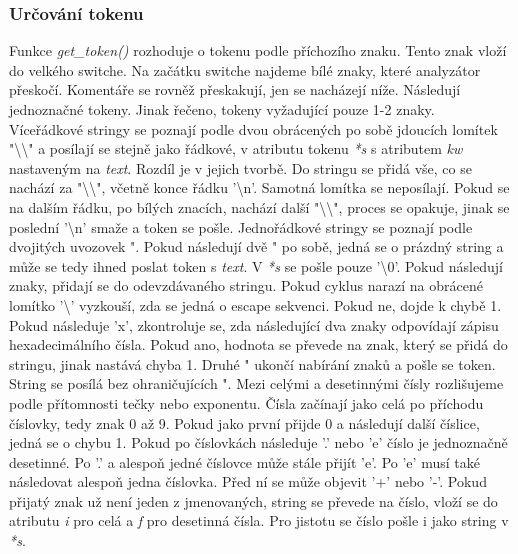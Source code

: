 \documentclass[a4paper, 12pt]{article}
\begin{document}
\subsubsection{Určování tokenu}
Funkce \textit{get\_token()} rozhoduje o tokenu podle příchozího znaku. Tento znak vloží do velkého switche.\newline
Na začátku switche najdeme bílé znaky, které analyzátor přeskočí. Komentáře se rovněž přeskakují, jen se nacházejí níže.\newline
Následují jednoznačné tokeny. Jinak řečeno, tokeny vyžadující pouze 1-2 znaky.\newline
Víceřádkové stringy se poznají podle dvou obrácených po sobě jdoucích lomítek "\textbackslash\textbackslash" a posílají se stejně jako řádkové, v atributu tokenu \textit{*s} s atributem \textit{kw} nastaveným na \textit{text}. Rozdíl je v jejich tvorbě. Do stringu se přidá vše, co se nachází za "\textbackslash\textbackslash", včetně konce řádku '\textbackslash n'. Samotná lomítka se neposílají. Pokud se na dalším řádku, po bílých znacích, nachází další "\textbackslash\textbackslash", proces se opakuje, jinak se poslední '\textbackslash n' smaže a token se pošle.\newline
Jednořádkové stringy se poznají podle dvojitých uvozovek ". Pokud následují dvě " po sobě, jedná se o prázdný string a může se tedy ihned poslat token s \textit{text}. V \textit{*s} se pošle pouze '\textbackslash0'. Pokud následují znaky, přidají se do odevzdávaného stringu. Pokud cyklus narazí na obrácené lomítko '\textbackslash' vyzkouší, zda se jedná o escape sekvenci. Pokud ne, dojde k chybě 1. Pokud následuje 'x', zkontroluje se, zda následující dva znaky odpovídají zápisu hexadecimálního čísla. Pokud ano, hodnota se převede na znak, který se přidá do stringu, jinak nastává chyba 1. Druhé " ukončí nabírání znaků a pošle se token. String se posílá bez ohraničujících ".\newline
Mezi celými a desetinnými čísly rozlišujeme podle přítomnosti tečky nebo exponentu. Čísla začínají jako celá po příchodu číslovky, tedy znak 0 až 9. Pokud jako první přijde 0 a následují další číslice, jedná se o chybu 1. Pokud po číslovkách následuje '.' nebo 'e' číslo je jednoznačně desetinné. Po '.' a alespoň jedné číslovce může stále přijít 'e'. Po 'e' musí také následovat alespoň jedna číslovka. Před ní se může objevit '+' nebo '-'. Pokud přijatý znak už není jeden z jmenovaných, string se převede na číslo, vloží se do atributu \textit{i} pro celá a \textit{f} pro desetinná čísla. Pro jistotu se číslo pošle i jako string v \textit{*s}.\newline
\end{document}
